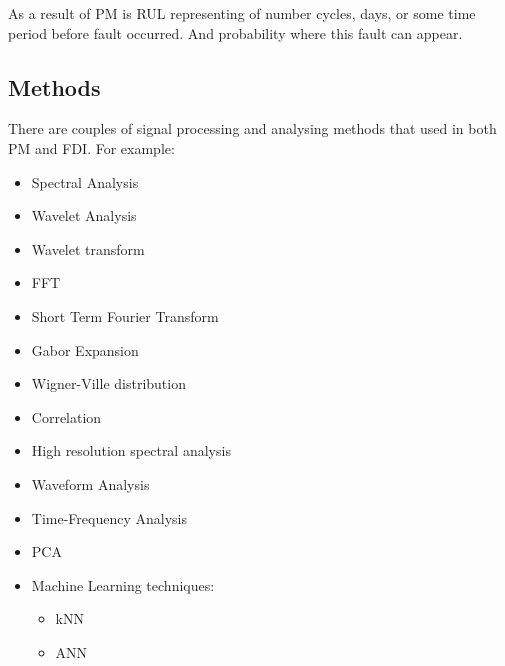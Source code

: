 \documentclass[class=article, crop=false]{standalone}
\begin{document}
As a result of PM is RUL representing of number cycles, days, or some time
period before fault occurred. And probability where this fault can appear.

\subsection{Methods}
There are couples of signal processing and analysing methods that used in
both PM and FDI. For example:
\begin{itemize}
    \item Spectral Analysis
    \item Wavelet Analysis
    \item Wavelet transform
    \item FFT
    \item Short Term Fourier Transform
    \item Gabor Expansion
    \item Wigner-Ville distribution
    \item Correlation
    \item High resolution spectral analysis
    \item Waveform Analysis
    \item Time-Frequency Analysis
    \item PCA
    \item Machine Learning techniques:
        \begin{itemize}
            \item kNN
            \item ANN
        \end{itemize}
\end{itemize}

\end{document}
